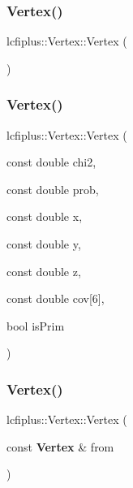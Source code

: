 \subsubsection{Vertex()\hspace{0.1cm}{\footnotesize\ttfamily [1/3]}}
{\footnotesize\ttfamily lcfiplus\+::\+Vertex\+::\+Vertex (\begin{DoxyParamCaption}{ }\end{DoxyParamCaption})\hspace{0.3cm}{\ttfamily [inline]}}

\mbox{\label{classlcfiplus_1_1Vertex_a25b20d08bbb3347b8874ffbca142dfe3}} 
\subsubsection{Vertex()\hspace{0.1cm}{\footnotesize\ttfamily [2/3]}}
{\footnotesize\ttfamily lcfiplus\+::\+Vertex\+::\+Vertex (\begin{DoxyParamCaption}\item[{const double}]{chi2,  }\item[{const double}]{prob,  }\item[{const double}]{x,  }\item[{const double}]{y,  }\item[{const double}]{z,  }\item[{const double}]{cov[6],  }\item[{bool}]{is\+Prim }\end{DoxyParamCaption})\hspace{0.3cm}{\ttfamily [inline]}}

\mbox{\label{classlcfiplus_1_1Vertex_a07031c14bfbd6521e37c0c81c6d25ea9}} 
\subsubsection{Vertex()\hspace{0.1cm}{\footnotesize\ttfamily [3/3]}}
{\footnotesize\ttfamily lcfiplus\+::\+Vertex\+::\+Vertex (\begin{DoxyParamCaption}\item[{const \textbf{ Vertex} \&}]{from }\end{DoxyParamCaption})\hspace{0.3cm}{\ttfamily [inline]}}


